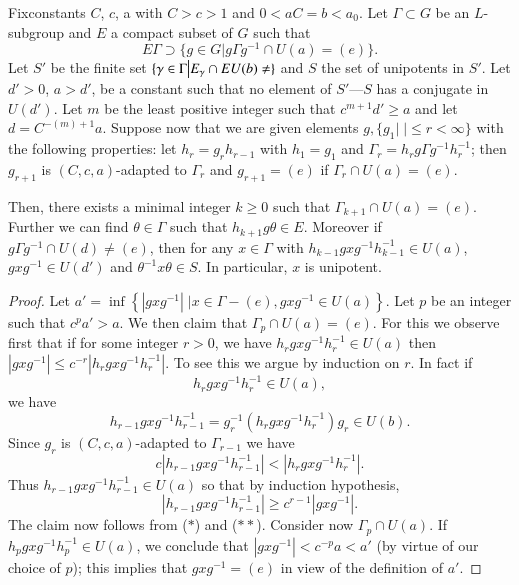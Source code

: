 \begin{lemma}\label{art9-lem1.5}
Fix\pageoriginale constants $C$, $c$, a with $C > c>1$ and $0 < aC = b < a_0$. Let $\Gamma \subset G$ be an $L$-subgroup and $E$ a compact subset of $G$ such that
$$
E \Gamma \supset \{g \in G \big| g \Gamma g^{-1} \cap U (a) = (e)\}.
$$
Let $S'$ be the finite set $\{\gamma \in \Gamma \big| E_\gamma \cap E U (b) \neq \empty\}$ and $S$ the set of unipotents in $S'$. Let $d'> 0$, $a > d'$, be a constant such that no element of $S'$---$S$ has a conjugate in $U (d')$. Let $m$ be the least positive integer such that $c^{m+1} d' \geqslant a$ and let $d = C^{-(m)+1}a$. Suppose now that we are given elements $g, \{g_1 \big| \; \big| \leqslant r < \infty\}$ with the following properties: let $h_r = g_r h_{r-1}$ with $h_1 = g_1$ and $\Gamma_r = h_r g \Gamma g^{-1} h_r^{-1}$; then $g_{r+1}$ is $(C, c, a)$-adapted to $\Gamma_r$ and $g_{r+1} = (e)$ if $\Gamma_r \cap U (a) = (e)$.

Then, there exists a minimal integer $k \geqslant 0$ such that $\Gamma_{k+1} \cap U (a) = (e)$. Further we can find $\theta \in \Gamma$ such that $h_{k+1} g \theta \in E$. Moreover if $g\Gamma g^{-1} \cap U (d) \neq (e)$, then for any $x \in \Gamma$ with $h_{k-1} g x g^{-1} h^{-1}_{k-1} \in U (a)$, $g x g^{-1} \in U (d')$ and $\theta^{-1} x \theta \in S$. In particular, $x$ is unipotent.
\end{lemma}

\begin{proof}
Let $a' = \inf \left\{\left|g x g^{-1} \right|  \; \big| x \in \Gamma - (e), g x g^{-1} \in U (a) \right\}$. Let $p$ be an integer such that $c^p a' > a$. We then claim that $\Gamma_p \cap U (a) = (e)$. For this we observe first that if for some integer $r > 0$, we have $h_r g x g^{-1} h^{-1}_r \in U (a)$ then $|g x g^{-1}| \leqslant c^{-r} |h_r g x g^{-1} h^{-1}_r|$. To see this we argue by induction on $r$. In fact if
$$
h_r g x g^{-1} h^{-1}_r \in U (a),
$$
we have 
$$
h_{r-1} g x g^{-1} h^{-1}_{r-1} = g^{-1}_r (h_r g x g^{-1} h_r^{-1}) g_r \in U (b).
$$
Since $g_r$ is $(C, c, a)$-adapted to $\Gamma_{r-1}$ we have 
\begin{equation*}
c|h_{r-1} g x g^{-1} h^{-1}_{r-1}| < | h_r g x g^{-1} h_r^{-1}|. \tag*{($\ast$)}
\end{equation*}
Thus $h_{r-1} g x g^{-1} h^{-1}_{r-1} \in U (a)$ so that by induction hypothesis,
\begin{equation*}
|h_{r-1} g x g^{-1} h^{-1}_{r-1}|  \geqslant c^{r-1} |g x g^{-1}|.
\tag*{($\ast\ast$)}
\end{equation*}
The claim now follows from ($\ast$) and ($\ast\ast$). Consider now $\Gamma_p \cap U (a)$. If $h_p g x g^{-1} h^{-1}_p \in U (a)$, we conclude that $|g x g^{-1}| < c^{-p} a < a'$ (by virtue of our choice of $p$); this implies that $g x g^{-1} = (e)$ in view of the definition of $a'$.
\end{proof}

